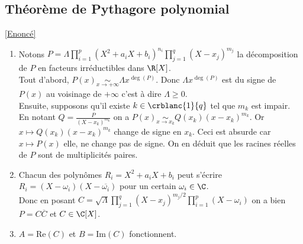 \documentclass{book}
\begin{document}
	\subsection{Théorème de Pythagore polynomial }
	\label{sec:théorème-de-pythagore-polynomial}
	\textcolor{blue}{\hyperref[Théorème de Pythagore polynomial]{[Enoncé]}}\\
	\begin{enumerate}[leftmargin=*]
		\item Notons $P=\Lambda\displaystyle\prod\limits_{i=1}^p{(X^2+a_iX+b_i)^{n_i}}\displaystyle\prod\limits_{j=1}^q{(X-x_j)^{m_j}}$ la décomposition de $P$ en facteurs irréductibles dans $\R[X]$.\\
		Tout d'abord, $P(x)\underset{x\to +\infty}{\sim}\Lambda x^{\deg(P)}$. Donc $\Lambda x^{\deg(P)}$ est du signe de $P(x)$ au voisinage de $+\infty$ c'est à dire $\Lambda\geq 0$.\\
		Ensuite, supposons qu'il existe $k\in \crblanc{1}{q}$ tel que $m_k$ est impair.\\
		En notant $Q=\displaystyle\frac{P}{(X-x_k)^{m_k}}$ on a $P(x)\underset{x\to x_k}{\sim}Q(x_k)(x-x_k)^{m_k}$. Or $x\mapsto Q(x_k)(x-x_k)^{m_k}$ change de signe en $x_k$. Ceci est absurde car $x\mapsto P(x)$ elle, ne change pas de signe. On en déduit que les racines réelles de $P$ sont de multiplicités paires.
		\item Chacun des polynômes $R_i=X^2+a_iX+b_i$ peut s'écrire $R_i=(X-\omega_i)(X-\overline{\omega_i})$ pour un certain $\omega_i\in \C$.\\
		Donc en posant $C=\displaystyle\sqrt{\Lambda}\displaystyle\prod\limits_{j=1}^q{(X-x_j)^{m_j/2}}\displaystyle\prod\limits_{i=1}^p{(X-\omega_i)}$ on a bien $P=C\overline{C}$ et $C\in \C[X]$.\\
		\item $A=\text{Re}(C)$ et $B=\text{Im}(C)$ fonctionnent.
	\end{enumerate}
	
\end{document}
